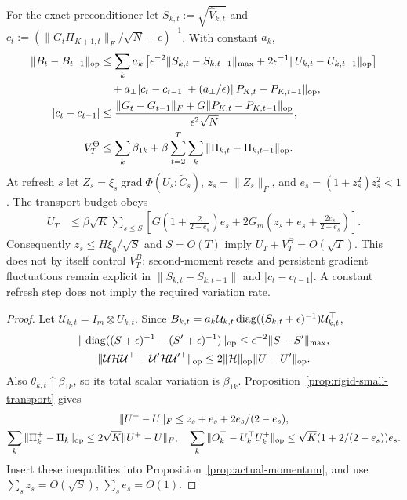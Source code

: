 \begin{proposition}
\label{prop:actual-budget-resolution}
For the exact preconditioner let $S_{k,t}:=\sqrt{\widehat V_{k,t}}$ and
$c_t:=(\|G_t\Pi_{K+1,t}\|_F/\sqrt N+\epsilon)^{-1}$. With constant $a_k$,
\begin{align}
 \|B_t-B_{t-1}\|_{\mathrm{op}}
 &\le\sum_k a_k\left[
 \epsilon^{-2}\|S_{k,t}-S_{k,t-1}\|_{\max}
 +2\epsilon^{-1}\|U_{k,t}-U_{k,t-1}\|_{\mathrm{op}}\right]\\
 &\quad+a_\perp|c_t-c_{t-1}|
       +(a_\perp/\epsilon)\|P_{K,t}-P_{K,t-1}\|_{\mathrm{op}},\\
 |c_t-c_{t-1}|
 &\le\frac{\|G_t-G_{t-1}\|_F+
                    G\|P_{K,t}-P_{K,t-1}\|_{\mathrm{op}}}{\epsilon^2\sqrt N},\\
 V_T^\Theta
 &\le\sum_k\beta_{1k}+\beta\sum_{t=2}^T\sum_k
                                  \|\Pi_{k,t}-\Pi_{k,t-1}\|_{\mathrm{op}}.
\end{align}
At refresh $s$ let $Z_s=\xi_s\operatorname{grad}\Phi(U_s;\widetilde C_s)$,
$z_s=\|Z_s\|_F$, and $e_s=(1+z_s^2)z_s^2<1$. The transport budget obeys
\begin{align}
 U_T&\le\beta\sqrt K\sum_{s\le S}\left[
 G\left(1+\frac2{2-e_s}\right)e_s
 +2G_m\left(z_s+e_s+\frac{2e_s}{2-e_s}\right)\right].
\end{align}
Consequently $z_s\le H\xi_0/\sqrt S$ and $S=O(T)$ imply
$U_T+V_T^\Theta=O(\sqrt T)$. This does not by itself control $V_T^B$:
second-moment resets and persistent gradient fluctuations remain explicit in
$\|S_{k,t}-S_{k,t-1}\|$ and $|c_t-c_{t-1}|$. A constant refresh step does not
imply the required variation rate.
\end{proposition}
\begin{proof}
Let $\mathcal U_{k,t}=I_m\otimes U_{k,t}$. Since
$B_{k,t}=a_k\mathcal U_{k,t}\operatorname{diag}((S_{k,t}+\epsilon)^{-1})\mathcal U_{k,t}^\top$,
\begin{gather}
 \|\operatorname{diag}((S+\epsilon)^{-1}-(S'+\epsilon)^{-1})\|_{\mathrm{op}}
 \le\epsilon^{-2}\|S-S'\|_{\max},\\
 \|\mathcal U\mathcal H\mathcal U^\top-
          \mathcal U'\mathcal H\mathcal U'^\top\|_{\mathrm{op}}
 \le2\|\mathcal H\|_{\mathrm{op}}\|U-U'\|_{\mathrm{op}}.
\end{gather}
Also $\theta_{k,t}\uparrow\beta_{1k}$, so its total scalar variation is
$\beta_{1k}$. Proposition~\ref{prop:rigid-small-transport} gives
\begin{gather}
 \|U^+-U\|_F\le z_s+e_s+2e_s/(2-e_s),\\
 \sum_k\|\Pi_k^+-\Pi_k\|_{\mathrm{op}}
 \le2\sqrt K\|U^+-U\|_F,\quad
 \sum_k\|O_k^\top-U_k^\top U_k^+\|_{\mathrm{op}}
 \le\sqrt K(1+2/(2-e_s))e_s.
\end{gather}
Insert these inequalities into Proposition~\ref{prop:actual-momentum}, and use
$\sum_sz_s=O(\sqrt S)$, $\sum_se_s=O(1)$.
\end{proof}
